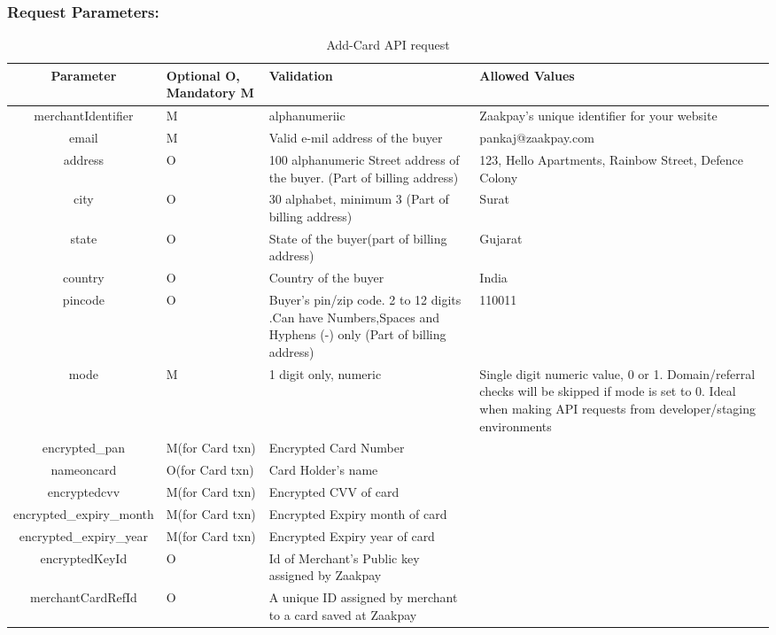\documentclass{article}
\begin{document}
\subsubsection{Request Parameters:}
\begin{longtable}{||c|| p{2.09cm}|| p{5.5cm}| p{4.7cm}||}
   \caption{Add-Card API request}\\
   \rowcolor{green!50}
\bfseries{Parameter} & \bfseries{Optional O, Mandatory M} & \bfseries{Validation} & \bfseries{Allowed Values} \\ \hline
merchantIdentifier & M & alphanumeriic& Zaakpay's unique identifier for your website \\
email & M& Valid e-mil address of the buyer& pankaj@zaakpay.com \\
address & O&100 alphanumeric Street   address   of   the   buyer.   (Part   of   billing address) & 123, Hello Apartments,   Rainbow Street, Defence Colony\\
city & O&30 alphabet, minimum 3   (Part of billing address) & Surat \\
state & O& State of the buyer(part of billing address)& Gujarat \\
country &O & Country of the buyer& India \\
pincode & O& Buyer's pin/zip   code. 2 to 12 digits .Can have Numbers,Spaces and Hyphens (-) only (Part of billing address) & 110011 \\
mode & M& 1 digit only, numeric& Single digit numeric value, 0 or 1. Domain/referral checks will be skipped if mode is set to 0. Ideal when making API requests from developer/staging environments \\
encrypted\_pan & M(for Card txn)& Encrypted Card Number& \\
nameoncard & O(for Card txn)&Card Holder's name & \\
encryptedcvv & M(for Card txn)& Encrypted CVV of card & \\
encrypted\_expiry\_month & M(for Card txn)&Encrypted Expiry month of card  & \\
encrypted\_expiry\_year & M(for Card txn)&Encrypted Expiry year of card & \\
encryptedKeyId & O&Id of Merchant's Public key assigned by Zaakpay & \\
merchantCardRefId & O&A unique ID assigned by merchant to a card saved at Zaakpay & \\
\end{longtable}
\end{document}
